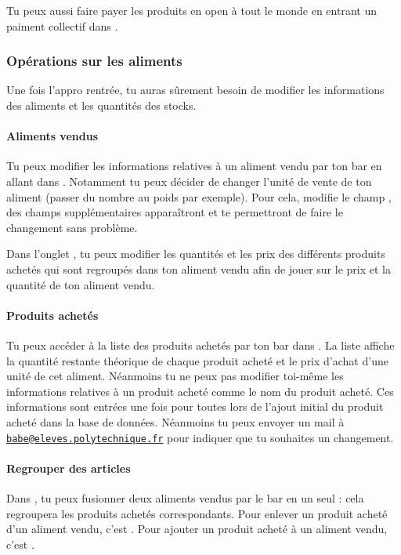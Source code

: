 \documentclass[12pt,french]{article}
\begin{document}
Tu peux aussi faire payer les produits en open à tout le monde en entrant un paiment collectif dans .

\subsubsection{Opérations sur les aliments}

Une fois l'appro rentrée, tu auras sûrement besoin de modifier les informations des aliments et les quantités des stocks.

\paragraph{Aliments vendus} Tu peux modifier les informations relatives à un aliment vendu par ton bar en allant dans . Notamment tu peux décider de changer l'unité de vente de ton aliment (passer du nombre au poids par exemple). Pour cela, modifie le champ , des champs supplémentaires apparaîtront et te permettront de faire le changement sans problème.

Dans l'onglet , tu peux modifier les quantités et les prix des différents produits achetés qui sont regroupés dans ton aliment vendu afin de jouer sur le prix et la quantité de ton aliment vendu.

\paragraph{Produits achetés} Tu peux accéder à la liste des produits achetés par ton bar dans . La liste affiche la quantité restante théorique de chaque produit acheté et le prix d'achat d'une unité de cet aliment. Néanmoins tu ne peux pas modifier toi-même les informations relatives à un produit acheté comme le nom du produit acheté. Ces informations sont entrées une fois pour toutes lors de l'ajout initial du produit acheté dans la base de données. Néanmoins tu peux envoyer un mail à \href{mailto:babe@eleves.polytechnique.fr}{\texttt{babe@eleves.polytechnique.fr}} pour indiquer que tu souhaites un changement.

\paragraph{Regrouper des articles} Dans , tu peux fusionner deux aliments vendus par le bar en un seul : cela regroupera les produits achetés correspondants. Pour enlever un produit acheté d'un aliment vendu, c'est . Pour ajouter un produit acheté à un aliment vendu, c'est .
\end{document}
